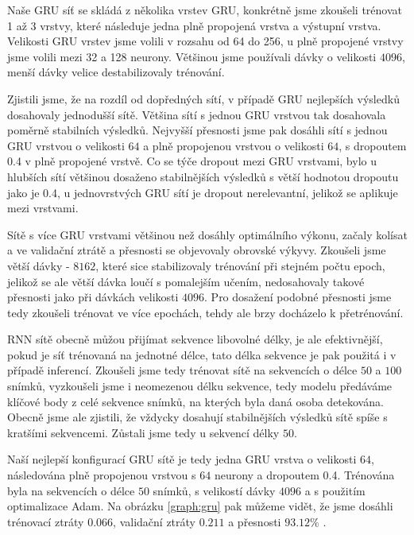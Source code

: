Naše GRU síť se skládá z několika vrstev GRU, konkrétně jsme zkoušeli trénovat
1 až 3 vrstvy, které následuje jedna plně propojená vrstva a výstupní vrstva.
Velikosti GRU vrstev jsme volili v rozsahu od 64 do 256, u plně propojené
vrstvy jsme volili mezi 32 a 128 neurony. Většinou jsme používali dávky o
velikosti $4096$, menší dávky velice destabilizovaly trénování.

Zjistili jsme, že na rozdíl od dopředných sítí, v případě GRU nejlepších
výsledků dosahovaly jednodušší sítě. Většina sítí s jednou GRU vrstvou tak
dosahovala poměrně stabilních výsledků. Nejvyšší přesnosti jsme pak dosáhli
sítí s jednou GRU vrstvou o velikosti $64$ a plně propojenou vrstvou o
velikosti $64$, s dropoutem 0.4 v plně propojené vrstvě. Co se týče dropout
mezi GRU vrstvami, bylo u hlubších sítí většinou dosaženo stabilnějších
výsledků s větší hodnotou dropoutu jako je 0.4, u jednovrstvých GRU sítí je
dropout nerelevantní, jelikož se aplikuje mezi vrstvami.

Sítě s více GRU vrstvami většinou než dosáhly optimálního výkonu, začaly
kolísat a ve validační ztrátě a přesnosti se objevovaly obrovské výkyvy.
Zkoušeli jsme větší dávky - $8162$, které sice stabilizovaly trénování při
stejném počtu epoch, jelikož se ale větší dávka loučí s pomalejším učením,
nedosahovaly takové přesnosti jako při dávkách velikosti $4096$. Pro dosažení
podobné přesnosti jsme tedy zkoušeli trénovat ve více epochách, tehdy ale brzy
docházelo k přetrénování.

RNN sítě obecně můžou přijímat sekvence libovolné délky, je ale efektivnější,
pokud je síť trénovaná na jednotné délce, tato délka sekvence je pak použitá i
v případě inferencí. Zkoušeli jsme tedy trénovat sítě na sekvencích o délce
$50$ a $100$ snímků, vyzkoušeli jsme i neomezenou délku sekvence, tedy modelu
předáváme klíčové body z celé sekvence snímků, na kterých byla daná osoba
detekována. Obecně jsme ale zjistili, že vždycky dosahují stabilnějších
výsledků sítě spíše s kratšími sekvencemi. Zůstali jsme tedy u sekvencí délky
$50$.

Naší nejlepší konfigurací GRU sítě je tedy jedna GRU vrstva o velikosti $64$,
následována plně propojenou vrstvou s $64$ neurony a dropoutem 0.4. Trénována
byla na sekvencích o délce $50$ snímků, s velikostí dávky $4096$ a s použitím
optimalizace Adam. Na obrázku \ref{graph:gru} pak můžeme vidět, že jsme dosáhli
trénovací ztráty $0.066$, validační ztráty $0.211$ a přesnosti $93.12\%$ .

